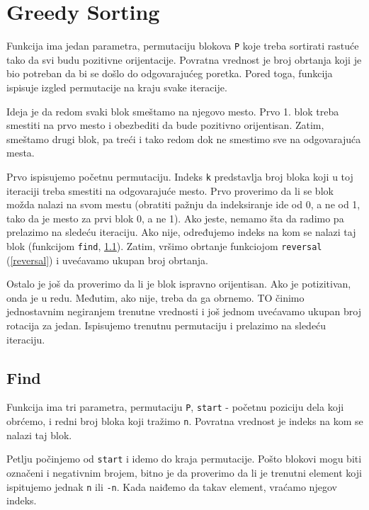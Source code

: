 \section{Greedy Sorting}

Funkcija ima jedan parametra, permutaciju blokova \texttt{P} koje treba sortirati rastuće tako da svi budu pozitivne orijentacije. Povratna vrednost je broj obrtanja koji je bio potreban da bi se došlo do odgovarajućeg poretka. Pored toga, funkcija ispisuje izgled permutacije na kraju svake iteracije.

Ideja je da redom svaki blok smeštamo na njegovo mesto. Prvo 1. blok treba smestiti na prvo mesto i obezbediti da bude pozitivno orijentisan. Zatim, smeštamo drugi blok, pa treći i tako redom dok ne smestimo sve na odgovarajuća mesta.

Prvo ispisujemo početnu permutaciju. Indeks \texttt{k} predstavlja broj bloka koji u toj iteraciji treba smestiti na odgovarajuće mesto. Prvo proverimo da li se blok možda nalazi na svom mestu (obratiti pažnju da indeksiranje ide od 0, a ne od 1, tako da je mesto za prvi blok 0, a ne 1). Ako jeste, nemamo šta da radimo pa prelazimo na sledeću iteraciju. Ako nije, određujemo indeks na kom se nalazi taj blok (funkcijom \texttt{find}, \ref{find}). Zatim, vršimo obrtanje funkciojom \texttt{reversal} (\ref{reversal}) i uvećavamo ukupan broj obrtanja. 

Ostalo je još da proverimo da li je blok ispravno orijentisan. Ako je potizitivan, onda je u redu. Međutim, ako nije, treba da ga obrnemo. TO činimo jednostavnim negiranjem trenutne vrednosti i još jednom uvećavamo ukupan broj rotacija za jedan. Ispisujemo trenutnu permutaciju i prelazimo na sledeću iteraciju.




\subsection{Find}
\label{find}

Funkcija ima tri parametra, permutaciju \texttt{P},  \texttt{start} - početnu poziciju dela koji obrćemo, i redni broj bloka koji tražimo \texttt{n}. Povratna vrednost je indeks na kom se nalazi taj blok.

Petlju počinjemo od \texttt{start} i idemo do kraja permutacije. Pošto blokovi mogu biti označeni i negativnim brojem, bitno je da proverimo da li je trenutni element koji ispitujemo jednak \texttt{n} ili \texttt{-n}. Kada naiđemo da takav element, vraćamo njegov indeks.

